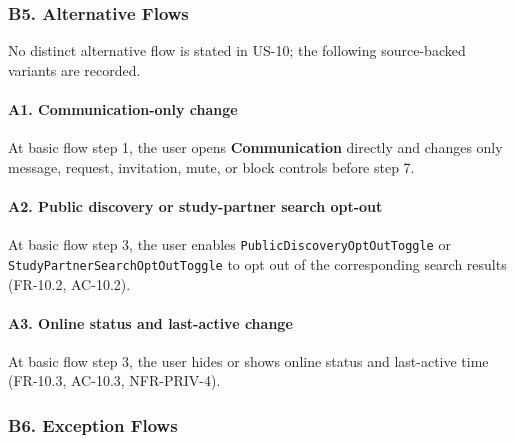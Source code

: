 \documentclass[12pt]{article}
\begin{document}
\hypertarget{sec:b5-alternative-flows}{}
\subsubsection*{B5. Alternative Flows}
\par\medskip

No distinct alternative flow is stated in US-10; the following source-backed variants are recorded.
\par\medskip

\hypertarget{sec:a1-communication-only-change}{}
\paragraph*{A1. Communication-only change}
\par\medskip

At basic flow step 1, the user opens \textbf{Communication} directly and changes only message, request, invitation, mute, or block controls before step 7.
\par\medskip

\hypertarget{sec:a2-public-discovery-or-study-partner-search-opt-out}{}
\paragraph*{A2. Public discovery or study-partner search opt-out}
\par\medskip

At basic flow step 3, the user enables \texttt{PublicDiscoveryOptOutToggle} or \texttt{StudyPartnerSearchOptOutToggle} to opt out of the corresponding search results (FR-10.2, AC-10.2).
\par\medskip

\hypertarget{sec:a3-online-status-and-last-active-change}{}
\paragraph*{A3. Online status and last-active change}
\par\medskip

At basic flow step 3, the user hides or shows online status and last-active time (FR-10.3, AC-10.3, NFR-PRIV-4).
\par\medskip

\hypertarget{sec:b6-exception-flows}{}
\subsubsection*{B6. Exception Flows}
\par\medskip
\end{document}
